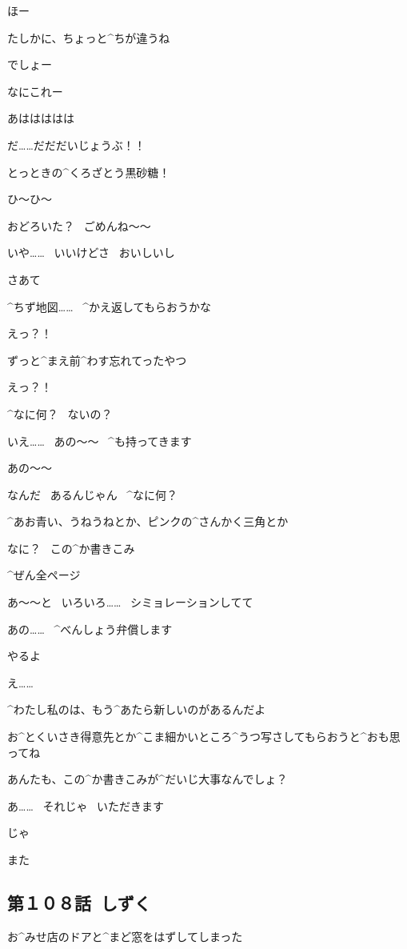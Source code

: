 \R ほー

\R たしかに、ちょっと^{ちが}{違}うね

\A でしょー

\page
\R なにこれー

\A あははははは

\A だ……だだだいじょうぶ！！

\A とっときの^{くろざとう}{黒砂糖}！

\A ひ〜ひ〜

\A おどろいた？
\ ごめんね〜〜

\R いや……
\ いいけどさ
\ おいしいし

\page
\R さあて

\R ^{ちず}{地図}……
\ ^{かえ}{返}してもらおうかな

\A えっ？！

\R ずっと^{まえ}{前}^{わす}{忘}れてったやつ

\A えっ？！

\R ^{なに}{何}？
\ ないの？

\A いえ……
\ あの〜〜
\ ^{も}{持}ってきます

\page
\A あの〜〜

\R なんだ
\ あるんじゃん
\ ^{なに}{何}？

\R ^{あお}{青}い、うねうねとか、ピンクの^{さんかく}{三角}とか

\R なに？
\ この^{か}{書}きこみ

\R ^{ぜん}{全}ページ

\A あ〜〜と
\ いろいろ……
\ シミョレーションしてて

\page
\A あの……
\ ^{べんしょう}{弁償}します

\R やるよ

\A え……

\R ^{わたし}{私}のは、もう^{あたら}{新}しいのがあるんだよ

\R お^{とくいさき}{得意先}とか^{こま}{細}かいところ^{うつ}{写}さしてもらおうと^{おも}{思}ってね

\R あんたも、この^{か}{書}きこみが^{だいじ}{大事}なんでしょ？

\A あ……
\ それじゃ
\ いただきます

\page
\R じゃ

\A また


\subsection{第１０８話\ しずく}

\page[118]
\A お^{みせ}{店}のドアと^{まど}{窓}をはずしてしまった

